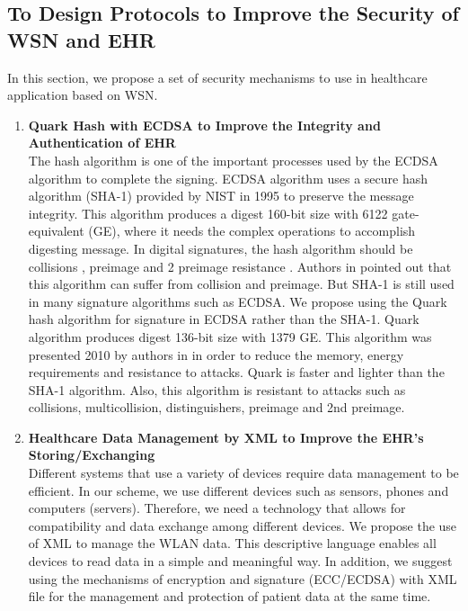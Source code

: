\documentclass[a4paper,11pt]{article}
\begin{document}
\subsection{To Design Protocols to Improve the Security of WSN and EHR}
In this section, we propose a set of security mechanisms to use in healthcare application based on WSN.
\begin{enumerate}

\item \textbf{Quark Hash with ECDSA to Improve the Integrity and Authentication of EHR}\\
The hash algorithm is one of the important processes used by the ECDSA algorithm to complete the signing. ECDSA algorithm uses a secure hash algorithm (SHA-1) provided by NIST in 1995 to preserve the message integrity. This algorithm produces a digest 160-bit size with 6122 gate-equivalent (GE), where it needs the complex operations to accomplish digesting message. In digital signatures, the hash algorithm should be collisions \cite{pr29}, preimage and 2 preimage resistance \cite{pr32}. Authors in \cite{pr32,pr30,pr31,pr29} pointed out that this algorithm can suffer from collision and preimage. But SHA-1 is still used in many signature algorithms such as ECDSA. We propose using the Quark hash algorithm for signature in ECDSA rather than the SHA-1. Quark algorithm produces digest 136-bit size with 1379 GE. This algorithm was presented 2010 by authors in \cite{p7} in order to reduce the memory, energy requirements and resistance to attacks. Quark is faster and lighter than the SHA-1 algorithm. Also, this algorithm is resistant to attacks such as collisions, multicollision, distinguishers, preimage and 2nd preimage.

\item \textbf{Healthcare Data Management by XML to Improve the EHR's Storing/Exchanging}\\
Different systems that use a variety of devices require data management to be efficient. In our scheme, we use different devices such as sensors, phones and computers (servers). Therefore, we need a technology that allows for compatibility and data exchange among different devices. We propose the use of XML to manage the WLAN data. This descriptive language enables all devices to read data in a simple and meaningful way. In addition, we suggest using the mechanisms of encryption and signature (ECC/ECDSA) with XML file for the management and protection of patient data at the same time.


\end{enumerate}
\end{document}
